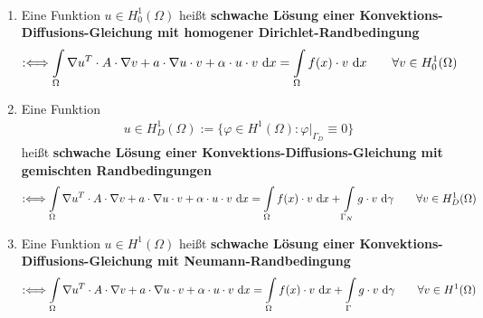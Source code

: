\begin{definition}\ %
\begin{enumerate}[label=(\roman*)]
\item Eine Funktion $u\in H_0^1(\Omega)$ heißt \textbf{schwache Lösung einer Konvektions-Diffusions-Gleichung mit homogener Dirichlet-Randbedingung}
\begin{align*}
:\Longleftrightarrow
\int\limits_\Omega\nabla u^T\cdot A\cdot\nabla v+a\cdot\nabla u\cdot v+\alpha\cdot u\cdot v\text{ d} x
=\int\limits_\Omega f(x)\cdot v\text{ d} x
\qquad\forall v\in H_0^1(\Omega)
\end{align*}
\item Eine Funktion 
\begin{align*}
u\in H_D^1(\Omega):=\big\lbrace\varphi\in H^1(\Omega):\varphi|_{\Gamma_D}\equiv 0\big\rbrace
\end{align*}
heißt \textbf{schwache Lösung einer Konvektions-Diffusions-Gleichung  mit gemischten Randbedingungen}
\begin{align*}
:\Longleftrightarrow
\int\limits_\Omega \nabla u^T\cdot A\cdot\nabla v+a\cdot\nabla u\cdot v+\alpha\cdot u\cdot v\text{ d} x
=\int\limits_\Omega f(x)\cdot v\text{ d} x+\int\limits_{\Gamma_N}g\cdot v\text{ d}\gamma
\qquad\forall v\in H^1_D(\Omega)
\end{align*}
\item Eine Funktion $u\in H^1(\Omega)$ heißt \textbf{schwache Lösung einer Konvektions-Diffusions-Gleichung mit Neumann-Randbedingung}
\begin{align*}
:\Longleftrightarrow
\int\limits_\Omega\nabla u^T\cdot A\cdot\nabla v+a\cdot\nabla u\cdot v+\alpha\cdot u\cdot v\text{ d} x
=\int\limits_\Omega f(x)\cdot v\text{ d} x+\int\limits_{\Gamma} g\cdot v\text{ d}\gamma
\qquad\forall v\in H^1(\Omega)
\end{align*}
\end{enumerate}
\end{definition}

